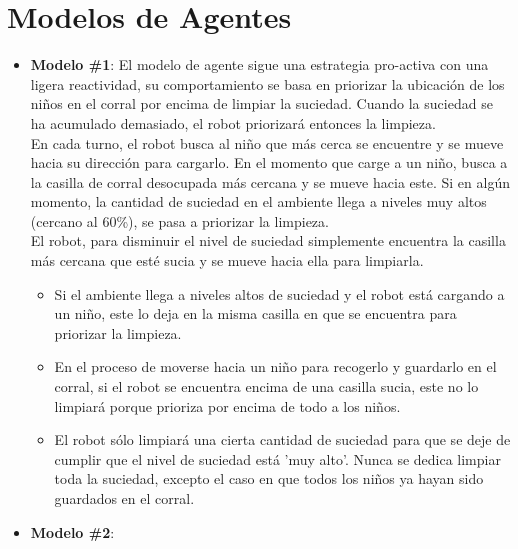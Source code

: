 \documentclass[12pt]{article}
\begin{document}
\section{Modelos de Agentes}
\begin{itemize}
	\item \textbf{Modelo \#1}:
	El modelo de agente sigue una estrategia pro-activa con una ligera
	reactividad, 
	su comportamiento se basa en priorizar la ubicaci\'on de los ni\~nos en el 
	corral por encima de limpiar la suciedad. Cuando la suciedad se
	ha acumulado demasiado, el robot priorizar\'a entonces la 
	limpieza.\\
	En cada turno, el robot busca al ni\~no que m\'as cerca se encuentre 
	y se mueve hacia su direcci\'on para cargarlo. En el momento que carge
	a un ni\~no, busca a la casilla de corral desocupada m\'as cercana y 
	se mueve hacia este. Si en alg\'un momento, la cantidad de suciedad en el
	ambiente llega a 	niveles muy altos (cercano al 60\%), se pasa a priorizar
	la limpieza.\\
	El robot, para disminuir el nivel de suciedad simplemente encuentra la 
	casilla m\'as cercana que est\'e sucia y se mueve hacia ella para limpiarla.
	\begin{itemize} \textit{Algunos detalles sobre este modelo:}
		\item Si el ambiente llega a niveles altos de suciedad y el robot 
		est\'a cargando a un ni\~no, este lo deja en la misma casilla en que se
		encuentra para priorizar la limpieza.
		\item En el proceso de moverse hacia un ni\~no para recogerlo y guardarlo
		en el corral, si el robot se encuentra encima de una casilla sucia, este 
		no lo limpiar\'a porque prioriza por encima de todo a los ni\~nos.
		\item El robot s\'olo limpiar\'a una cierta cantidad de suciedad para que
		se deje de cumplir que el nivel de suciedad est\'a 'muy alto'. Nunca se 
		dedica limpiar toda la suciedad, excepto el caso en que todos los ni\~nos
		ya hayan sido guardados en el corral.
	\end{itemize}
	\item \textbf{Modelo \#2}:
\end{itemize}
\end{document}
